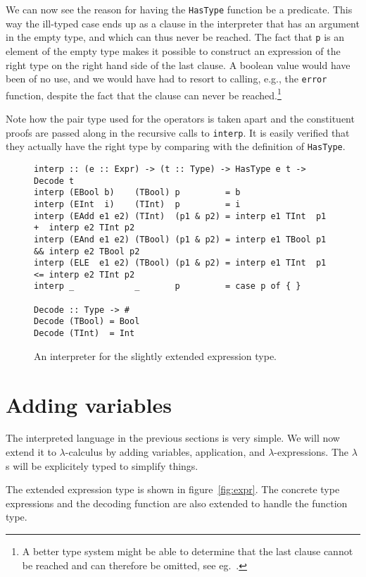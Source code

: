 \documentclass{llncs}[12pt]             %
\newcommand{\te}[1]{{\tt #1}}
\begin{document}
We can now see the reason for having the \te{HasType} function
be a predicate.  This way the ill-typed case ends up as
a clause in the interpreter that has an argument in the
empty type, and which can thus never be reached.  The fact that
\te{p} is an element of the empty type makes it possible to
construct an expression of the right type on the right hand side
of the last clause.  A boolean value would have been of no use,
and we would have had to resort to calling, e.g., the \te{error}
function, despite the fact that the clause can never be reached.\footnote{
A better type system might be able to determine that the last
clause cannot be reached and can therefore be omitted, 
see eg.\ \cite{coquand:patternmatching}.}

Note how the pair type used for the operators is taken apart
and the constituent proofs are passed along in the recursive
calls to \te{interp}.  It is easily verified that they actually
have the right type by comparing with the definition of \te{HasType}.

\begin{figure}
\begin{verbatim}
interp :: (e :: Expr) -> (t :: Type) -> HasType e t -> Decode t
interp (EBool b)    (TBool) p         = b
interp (EInt  i)    (TInt)  p         = i
interp (EAdd e1 e2) (TInt)  (p1 & p2) = interp e1 TInt  p1 +  interp e2 TInt p2
interp (EAnd e1 e2) (TBool) (p1 & p2) = interp e1 TBool p1 && interp e2 TBool p2
interp (ELE  e1 e2) (TBool) (p1 & p2) = interp e1 TInt  p1 <= interp e2 TInt p2
interp _            _       p         = case p of { }

Decode :: Type -> #
Decode (TBool) = Bool
Decode (TInt)  = Int
\end{verbatim}
\caption{An interpreter for the slightly extended expression type.}
\label{fig:imiddle}
\end{figure}

\section{Adding variables}
The interpreted language in the previous sections is very simple.
We will now extend it to $\lambda$-calculus by adding variables,
application, and $\lambda$-expressions.  The $\lambda$s will be
explicitely typed to simplify things.

The extended expression type is shown in figure~\ref{fig:expr}.
The concrete type expressions and the decoding function are also
extended to handle the function type.
\end{document}
